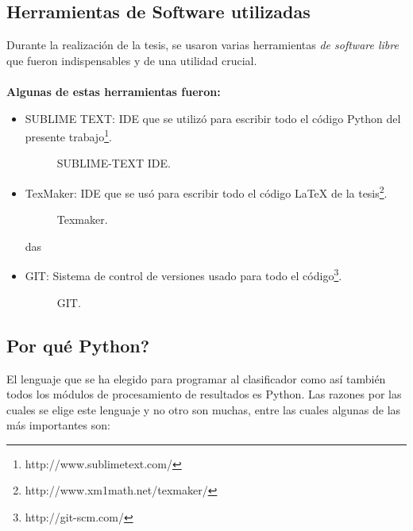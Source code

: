 	\subsection{Herramientas de Software utilizadas}
	    Durante la realización de la tesis, se usaron varias herramientas \textit{de software libre} que fueron indispensables y de una utilidad crucial. \\
	    \\
	   \textbf{ Algunas de estas herramientas fueron:}
	   \begin{itemize}

	       \item SUBLIME TEXT: IDE que se utilizó para escribir todo el código Python del presente trabajo\footnote{http://www.sublimetext.com/}.
					\begin{figure}[htbp]
						\centering
						\caption{SUBLIME-TEXT IDE.}
						\label{fig:sublime_ide}
					\end{figure}

	       \item TexMaker: IDE que se usó para escribir todo el código \LaTeX{} de la tesis\footnote{http://www.xm1math.net/texmaker/}.
					\begin{figure}[htbp]
						\centering
						\caption{Texmaker.}
						\label{fig:texmaker}
					\end{figure}
das
	       \item GIT: Sistema de control de versiones usado para todo el código\footnote{http://git-scm.com/}.
					\begin{figure}[htbp]
						\centering
						\caption{GIT.}
						\label{fig:git}
					\end{figure}
	   \end{itemize}
	
	\subsection{Por qué Python?}	
	
	El lenguaje que se ha elegido para programar al clasificador como así también todos los módulos de procesamiento de resultados es Python. Las razones por las cuales se elige este lenguaje y no otro son muchas, entre las cuales algunas de las más importantes son:
	
